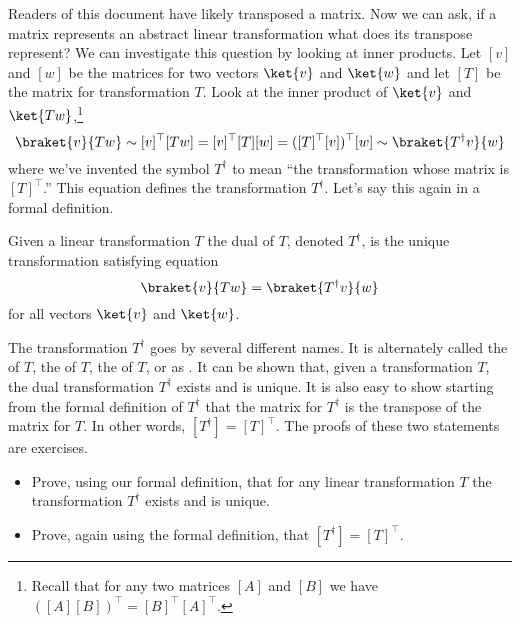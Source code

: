 
Readers of this document have likely transposed a matrix.
Now we can ask, if a matrix represents an abstract linear transformation what does its transpose represent?
We can investigate this question by looking at inner products.
Let $[v]$ and $[w]$ be the matrices for two vectors $\ket{v}$ and $\ket{w}$ and let $[T]$ be the matrix for transformation $T$.
Look at the inner product of $\ket{v}$ and $\ket{Tw}$,\footnote{Recall that for any two matrices $[A]$ and $[B]$ we have $ ([A][B])^{\top} = [B]^{\top}[A]^{\top}$.}
\begin{displaymath}
  \braket{v}{Tw} \sim [v]^{\top}[Tw] = [v]^{\top}[T][w] = ([T]^{\top}[v])^{\top}[w] \sim \braket{T^{\dag}v}{w}
\end{displaymath}
where we've invented the symbol $T^{\dag}$ to mean ``the transformation whose matrix is $[T]^{\top}$.''
This equation defines the transformation $T^{\dag}$.
Let's say this again in a formal definition.

\begin{definition}
Given a linear transformation $T$ the dual of $T$, denoted $T^{\dag}$, is the unique transformation satisfying equation
\begin{displaymath}
  \braket{v}{Tw} = \braket{T^{\dag}v}{w}
\end{displaymath}
for all vectors $\ket{v}$ and $\ket{w}$.
\end{definition}
The transformation $T^\dag$ goes by several different names.
It is alternately called the  of $T$, the  of $T$, the  of $T$, or as .
It can be shown that, given a transformation $T$, the dual transformation $T^{\dag}$ exists and is unique.
It is also easy to show starting from the formal definition of $T^\dag$ that the matrix for $T^\dag$ is the transpose of the matrix for $T$.
In other words, \mbox{$[T^{\dag}] = [T]^{\top}$.}
The proofs of these two statements are exercises.

\begin{itemize}
  \item[1)] Prove, using our formal definition, that for any linear transformation $T$ the transformation $T^{\dag}$ exists and is unique.
  \item[2)] Prove, again using the formal definition, that $[T^{\dag}] = [T]^{\top}$.
\end{itemize}

